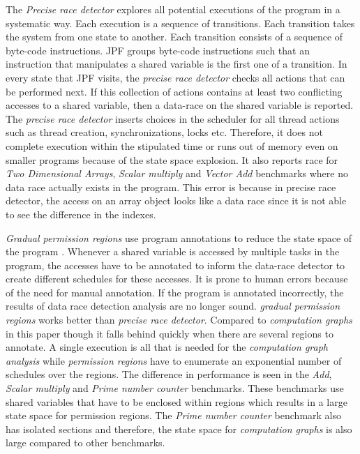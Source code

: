 The \textit{Precise race detector} explores all potential executions of the program in a systematic way. Each execution is a sequence of transitions. Each transition takes the system from one state to another. Each transition consists of a sequence of byte-code instructions. JPF groups byte-code instructions such that an instruction that manipulates a shared variable is the first one of a transition. In every state that JPF visits, the \textit{precise race detector} checks all actions that can be performed next. If this collection of actions contains at least two conflicting accesses to a shared variable, then a data-race on the shared variable is reported. The \textit{precise race detector} inserts choices in the scheduler for all thread actions such as thread creation, synchronizations, locks etc. Therefore, it does not complete execution within the stipulated time or runs out of memory even on smaller programs because of the state space explosion. It also reports race for \textit{Two Dimensional Arrays}, \textit{Scalar multiply} and \textit{Vector Add} benchmarks where no data race actually exists in the program. This error is because in precise race detector, the access on an array object looks like a data race since it is not able to see the difference in the indexes.

\textit{Gradual permission regions} use program annotations to reduce the state space of the program \cite{mercer2015model}. Whenever a shared variable is accessed by multiple tasks in the program, the accesses have to be annotated to inform the data-race detector to create different schedules for these accesses. It is prone to human errors because of the need for manual annotation. If the program is annotated incorrectly, the results of data race detection analysis are no longer sound. \textit{gradual permission regions} works better than \textit{precise race detector}. Compared to \textit{computation graphs} in this paper though it falls behind quickly when there are several regions to annotate. A single execution is all that is needed for the \textit{computation graph analysis} while \textit{permission regions} have to enumerate an exponential number of schedules over the regions. The difference in performance is seen in the \textit{Add}, \textit{Scalar multiply} and \textit{Prime number counter} benchmarks. These benchmarks use shared variables that have to be enclosed within regions which results in a large state space for permission regions. The \textit{Prime number counter} benchmark also has isolated sections and therefore, the state space for \textit{computation graphs} is also large compared to other benchmarks.

